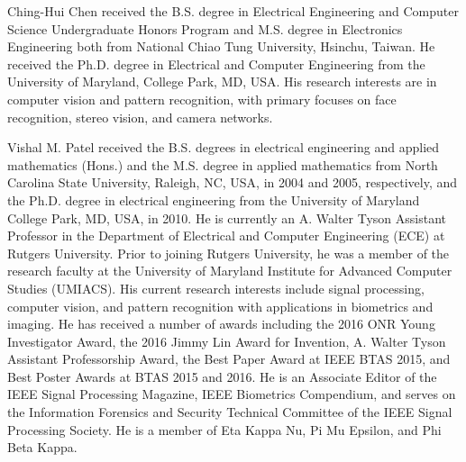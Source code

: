 \documentclass[10pt,journal,compsoc]{IEEEtran}
\begin{document}


\vspace{-20pt}
\begin{IEEEbiography}{Ching-Hui Chen}
received the B.S. degree in Electrical
Engineering and Computer Science Undergraduate
Honors Program and M.S. degree in Electronics
Engineering both from National Chiao Tung University,
Hsinchu, Taiwan. He received the Ph.D. degree in Electrical and Computer
Engineering from the University of Maryland,
College Park, MD, USA. His research interests are
in computer vision and pattern recognition, with
primary focuses on face recognition, stereo vision, and camera networks.
\end{IEEEbiography}
\vspace{-20pt}
\begin{IEEEbiography}{Vishal M. Patel}
received the B.S. degrees in electrical engineering and applied mathematics (Hons.) and the M.S. degree in applied mathematics from North Carolina State University, Raleigh, NC, USA, in 2004 and 2005, respectively, and the Ph.D. degree in electrical engineering from the University of Maryland College Park, MD, USA, in 2010. He is currently an A. Walter Tyson Assistant Professor in the Department of Electrical and Computer Engineering (ECE) at Rutgers University.  Prior to joining Rutgers University, he was a member of the research faculty at the University of Maryland Institute for Advanced Computer Studies (UMIACS). His current research interests include signal processing, computer vision, and pattern recognition with applications in biometrics and imaging. He has received a number of awards including the 2016 ONR Young Investigator Award, the 2016 Jimmy Lin Award for Invention,  A. Walter Tyson Assistant Professorship Award, the Best Paper Award at IEEE BTAS 2015, and Best Poster Awards at BTAS 2015 and 2016.  He is an Associate Editor of the IEEE Signal Processing Magazine,  IEEE Biometrics Compendium, and serves on the Information Forensics and Security Technical Committee of the IEEE Signal Processing Society.   He is a member of Eta Kappa Nu, Pi Mu Epsilon, and Phi Beta Kappa.\end{IEEEbiography}
\end{document}
